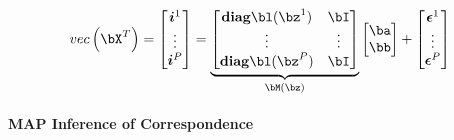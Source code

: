\documentclass[../writeup.tex]{subfiles}
\begin{document}
\begin{align}
    \vec{\bX^T}
        =
    \begin{bmatrix}
        \si^1 \\
        \vdots \\
        \si^P \\
    \end{bmatrix}
        =
        \underbrace{
            \begin{bmatrix}
                \diag \bl(\bz^1) & \bI \\ 
                \vdots & \vdots \\ 
                \diag \bl(\bz^P) & \bI \\
            \end{bmatrix}
        }_{\bM(\bz)}
        \begin{bmatrix}
            \ba \\ \bb 
        \end{bmatrix}
        + \begin{bmatrix}
            \bepsilon^1 \\
            \vdots  \\
            \bepsilon^P
        \end{bmatrix}
    \label{eq:per_pixel_image_formation_patterned_image_given_correspondence}
\end{align}


\paragraph{MAP Inference of Correspondence}
\end{document}
